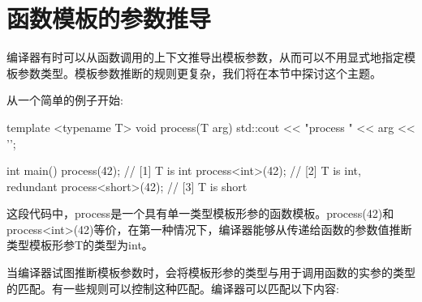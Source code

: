 \section{函数模板的参数推导}
编译器有时可以从函数调用的上下文推导出模板参数，从而可以不用显式地指定模板参数类型。模板参数推断的规则更复杂，我们将在本节中探讨这个主题。

从一个简单的例子开始:

\begin{cpp}
template <typename T>
void process(T arg)
{
	std::cout << "process " << arg << '\n';
}

int main()
{
	process(42); // [1] T is int
	process<int>(42); // [2] T is int, redundant
	process<short>(42); // [3] T is short
}
\end{cpp}

这段代码中，process是一个具有单一类型模板形参的函数模板。process(42)和process<int>(42)等价，在第一种情况下，编译器能够从传递给函数的参数值推断类型模板形参T的类型为int。

当编译器试图推断模板参数时，会将模板形参的类型与用于调用函数的实参的类型的匹配。有一些规则可以控制这种匹配。编译器可以匹配以下内容:


